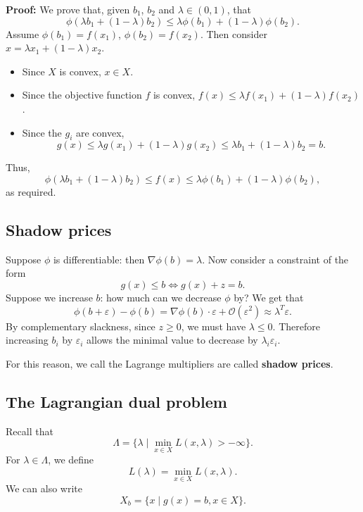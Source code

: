 \documentclass[12pt]{article}
\theoremstyle{definition}
\theoremstyle{remark}
\begin{document}
\begin{adjustbox}{minipage = \columnwidth - 25.5pt, margin=1em, frame=1pt, margin=0em}
\textbf{Proof:} We prove that, given $b_1$, $b_2$ and $\lambda \in (0, 1)$, that
\[
	\phi(\lambda b_1 + (1 - \lambda)b_2) \leq \lambda \phi(b_1) + (1 - \lambda) \phi(b_2)
.\]
Assume $\phi(b_1) = f(x_1)$, $\phi(b_2) = f(x_2)$. Then consider $x = \lambda x_1 + (1 - \lambda) x_2$.
\begin{itemize}
	\item Since $X$ is convex, $x \in X$.
	\item Since the objective function $f$ is convex, $f(x) \leq \lambda f(x_1) + (1 - \lambda) f(x_2)$.
	\item Since the $g_i$ are convex,
		\[
			g(x) \leq \lambda g(x_1) + (1 - \lambda)g(x_2) \leq \lambda b_1 + (1 - \lambda) b_2 = b
		.\]
	
\end{itemize}
Thus,
\[
	\phi(\lambda b_1 + (1 - \lambda)b_2) \leq f(x) \leq \lambda \phi(b_1) + (1 - \lambda)\phi(b_2)
,\]
as required.
\end{adjustbox}

\subsection{Shadow prices}%
\label{sub:shadow_prices}

Suppose $\phi$ is differentiable: then $\nabla \phi(b) = \lambda$. Now consider a constraint of the form
\[
	g(x) \leq b \iff g(x) + z = b
.\]
Suppose we increase $b$: how much can we decrease $\phi$ by? We get that
\[
	\phi(b + \varepsilon) - \phi(b) = \nabla \phi(b) \cdot \varepsilon + \mathcal{O}(\varepsilon^2) \approx \lambda^{T} \varepsilon
.\]
By complementary slackness, since $z \geq 0$, we must have $\lambda \leq 0$. Therefore increasing $b_i$ by $\varepsilon_i$ allows the minimal value to decrease by $\lambda_i \varepsilon_i$.

For this reason, we call the Lagrange multipliers are called \textbf{shadow prices}.

\subsection{The Lagrangian dual problem}%
\label{sub:the_lagrangian_dual_problem}

Recall that
\[
	\Lambda = \{ \lambda \mid \min_{x \in X} L(x, \lambda) > -\infty\}
.\]
For $\lambda \in \Lambda$, we define
\[
	L(\lambda) = \min_{x \in X} L(x, \lambda)
.\]
We can also write
\[
	X_b = \{x \mid g(x) = b, x \in X\}
.\]
\end{document}
